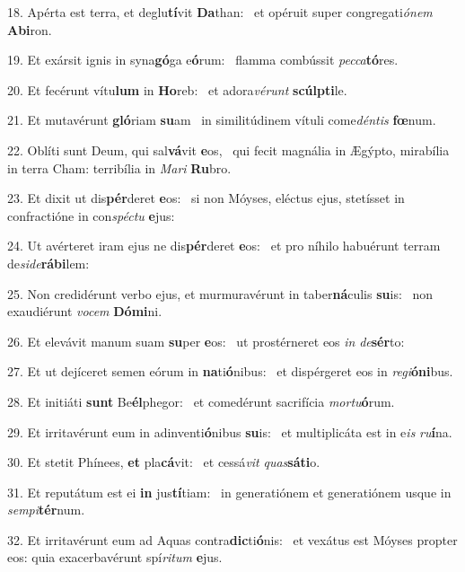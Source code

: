 18. Apérta est terra, et deglu\textbf{tí}vit \textbf{Da}than: \ast\  et opéruit super congregati\textit{ó}\textit{nem} \textbf{Ab}\textbf{i}ron.\

19. Et exársit ignis in syna\textbf{gó}ga e\textbf{ó}rum: \ast\  flamma combússit \textit{pec}\textit{ca}\textbf{tó}res.\

20. Et fecérunt vítu\textbf{lum} in \textbf{Ho}reb: \ast\  et adora\textit{vé}\textit{runt} \textbf{scúlp}\textbf{ti}le.\

21. Et mutavérunt \textbf{gló}riam \textbf{su}am \ast\  in similitúdinem vítuli come\textit{dén}\textit{tis} \textbf{fœ}num.\

22. Oblíti sunt Deum, qui sal\textbf{vá}vit \textbf{e}os, \ast\  qui fecit magnália in Ægýpto, mirabília in terra Cham: terribília in \textit{Ma}\textit{ri} \textbf{Ru}bro.\

23. Et dixit ut dis\textbf{pér}deret \textbf{e}os: \ast\  si non Móyses, eléctus ejus, stetísset in confractióne in con\textit{spéc}\textit{tu} \textbf{e}jus:\

24. Ut avérteret iram ejus ne dis\textbf{pér}deret \textbf{e}os: \ast\  et pro níhilo habuérunt terram de\textit{si}\textit{de}\textbf{rá}\textbf{bi}lem:\

25. Non credidérunt verbo ejus, et murmuravérunt in taber\textbf{ná}culis \textbf{su}is: \ast\  non exaudiérunt \textit{vo}\textit{cem} \textbf{Dó}\textbf{mi}ni.\

26. Et elevávit manum suam \textbf{su}per \textbf{e}os: \ast\  ut prostérneret eos \textit{in} \textit{de}\textbf{sér}to:\

27. Et ut dejíceret semen eórum in \textbf{na}ti\textbf{ó}nibus: \ast\  et dispérgeret eos in \textit{re}\textit{gi}\textbf{ó}\textbf{ni}bus.\

28. Et initiáti \textbf{sunt} Be\textbf{él}phegor: \ast\  et comedérunt sacrifícia \textit{mor}\textit{tu}\textbf{ó}rum.\

29. Et irritavérunt eum in adinventi\textbf{ó}nibus \textbf{su}is: \ast\  et multiplicáta est in e\textit{is} \textit{ru}\textbf{í}na.\

30. Et stetit Phínees, \textbf{et} pla\textbf{cá}vit: \ast\  et cessá\textit{vit} \textit{quas}\textbf{sá}\textbf{ti}o.\

31. Et reputátum est ei \textbf{in} jus\textbf{tí}tiam: \ast\  in generatiónem et generatiónem usque in \textit{sem}\textit{pi}\textbf{tér}num.\

32. Et irritavérunt eum ad Aquas contra\textbf{dic}ti\textbf{ó}nis: \ast\  et vexátus est Móyses propter eos: quia exacerbavérunt spí\textit{ri}\textit{tum} \textbf{e}jus.\

